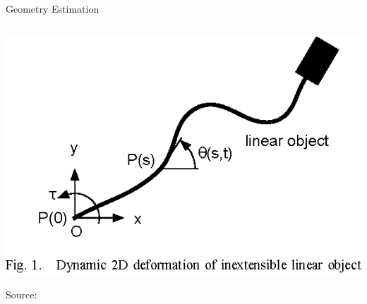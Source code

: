\documentclass[
xcolor=dvipsnames,
aspectratio=169,
9pt,
]{beamer}
\begin{document}
\begin{frame}{Geometry Estimation}
\begin{columns}
	\begin{column}{.4\textwidth}
		\includegraphics[width=\columnwidth]{model.eps}
		\begin{flushright}
			{\tiny	\textcolor{uniSgrey!50}{ Source: \cite{wakamatsu2004}} } 
		\end{flushright}
	\end{column}
\end{columns}


\end{frame}

%
\end{document}
